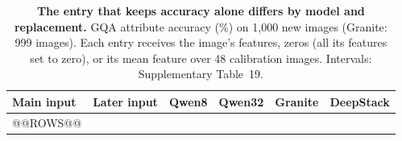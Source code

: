 \begin{table}[t]
\centering
\caption{\textbf{The entry that keeps accuracy alone differs by model and replacement.} GQA attribute accuracy (\%) on 1,000 new images (Granite: 999 images). Each entry receives the image's features, zeros (all its features set to zero), or its mean feature over 48 calibration images. Intervals: Supplementary Table~19.}
\label{tab:coding}
\begingroup
\fontsize{9}{10.5}\selectfont
\setlength{\tabcolsep}{3.3pt}
\renewcommand{\arraystretch}{1.08}
\begin{tabular}{@{}llcccc@{}}
\toprule
\rowcolor{DSTableHeader}
Main input & Later input & Qwen8 & Qwen32 & Granite & DeepStack \\
\midrule
@@ROWS@@
\bottomrule
\end{tabular}
\endgroup
\end{table}
